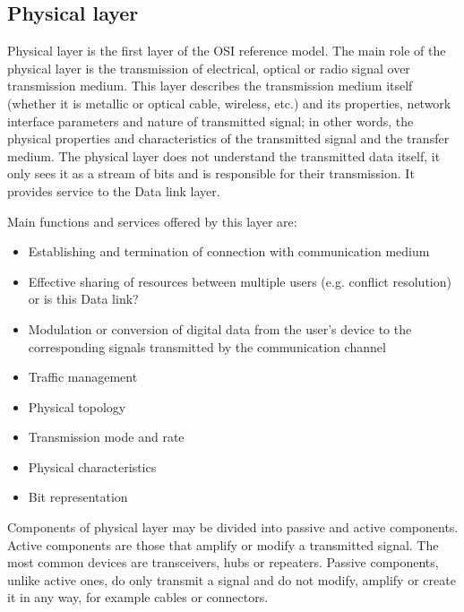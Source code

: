 \subsection{Physical layer}
Physical layer is the first layer of the OSI reference model. The main role of the physical layer is the transmission of electrical, optical or radio signal over transmission medium. This layer describes the transmission medium itself (whether it is metallic or optical cable, wireless, etc.) and its properties, network interface parameters and nature of transmitted signal; in other words, the physical properties and characteristics of the transmitted signal and the transfer medium. The physical layer does not understand the transmitted data itself, it only sees it as a stream of bits and is responsible for their transmission. It provides service to the Data link layer.

Main functions and services offered by this layer are:
\begin{itemize}[noitemsep]
    \item Establishing and termination of connection with communication medium
    \item Effective sharing of resources between multiple users (e.g. conflict resolution) or is this Data link?
    \item Modulation or conversion of digital data from the user’s device to the corresponding signals transmitted by the communication channel 
    \item Traffic management
    \item Physical topology
    \item Transmission mode and rate
    \item Physical characteristics
    \item Bit representation
\end{itemize}

Components of physical layer may be divided into passive and active components. Active components are those that amplify or modify a transmitted signal. The most common devices are transceivers, hubs or repeaters. Passive components, unlike active ones, do only transmit a signal and do not modify, amplify or create it in any way, for example cables or connectors.

